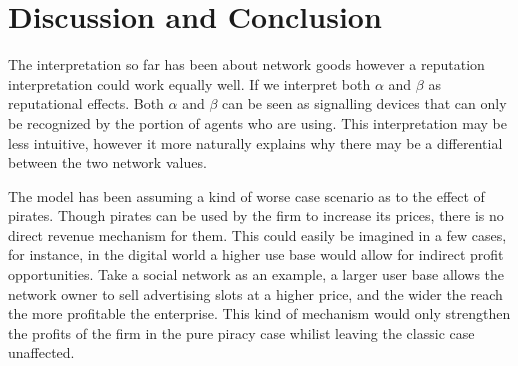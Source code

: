 




\section{Discussion and Conclusion}
The interpretation so far has been about network goods however a reputation interpretation could work equally well. If we interpret both $\alpha$ and $\beta$ as reputational effects. Both $\alpha$ and $\beta$ can be seen as signalling devices that can only be recognized by the portion of agents who are using. This interpretation may be less intuitive, however it more naturally explains why there may be a differential between the two network values.

The model has been assuming a kind of worse case scenario as to the effect of pirates. Though pirates can be used by the firm to increase its prices, there is no direct revenue mechanism for them. This could easily be imagined in a few cases, for instance, in the digital world a higher use base would allow for indirect profit opportunities. Take a social network as an example, a larger user base allows the network owner to sell advertising slots at a higher price, and the wider the reach the more profitable the enterprise. This kind of mechanism would only strengthen the profits of the firm in the pure piracy case whilist leaving the classic case unaffected. 

